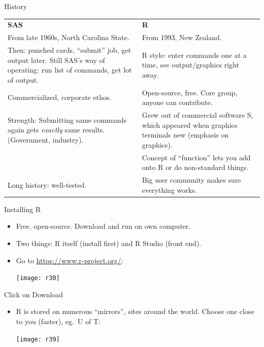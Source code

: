 \documentclass[unknownkeysallowed]{beamer}\usepackage[]{graphicx}\usepackage[]{color}
\begin{document}
\begin{frame}{History}
  
  \begin{tabular}{p{}p{}}
    \textbf{SAS} & \textbf{R}\\
    From late 1960s, North Carolina State.&
From 1993, New Zealand.\\                                            
    Then: punched cards, ``submit'' job, get output later.
    Still SAS's way of operating: run list of commands, get lot
      of output.& R style: enter commands one at a time, see output/graphics
      right away.\\
                 
    Commercialized, corporate ethos.             & Open-source, free. Core group, anyone can contribute.\\
    Strength: Submitting same commands again gets \emph{exactly}
      same results. (Government, industry).& 
    Grew out of commercial software S, which appeared when
      graphics terminals new (emphasis on graphics).\\
                                             & Concept of ``function'' lets you add onto R or do
      non-standard things.\\
    Long history: well-tested.&Big user community makes sure everything works.
    
  \end{tabular}
  
  \end{frame}

\begin{frame}{Installing R}

  \begin{itemize}
  \item Free, open-source. Download and run on own computer.
  \item Two things: R itself (install first) and R Studio (front end).
    \item Go to \url{https://www.r-project.org/}:
      
      \texttt{[image: r30]}
  \end{itemize}
  
\end{frame}

\begin{frame}[fragile]{Click on Download}
  
  \begin{itemize}
  \item R is stored on numerous ``mirrors'', sites around the
    world. Choose one close to you (faster), eg.\ U of T:
    
    \texttt{[image: r39]}
  \end{itemize}
  
\end{frame}
\end{document}
